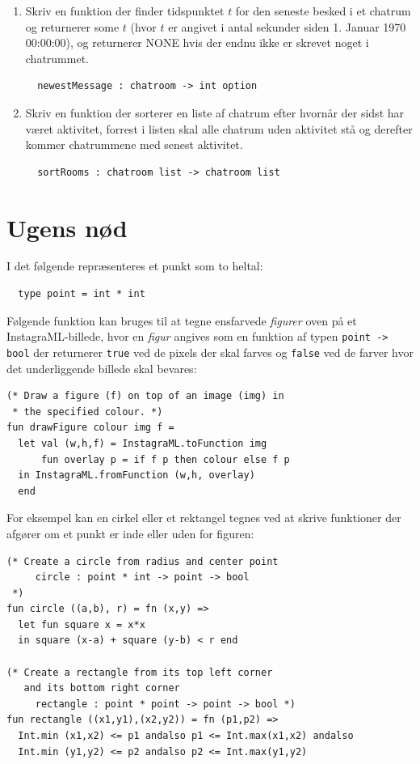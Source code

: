 \documentclass[a4paper,12pt]{article}
\begin{document}
\begin{enumerate}[{4I}1]
\item Skriv en funktion der finder tidspunktet $t$ for den seneste
  besked i et chatrum og returnerer some $t$ (hvor $t$ er angivet i
  antal sekunder siden 1. Januar 1970 00:00:00), og returnerer NONE
  hvis der endnu ikke er skrevet noget i chatrummet.
\begin{lstlisting}
  newestMessage : chatroom -> int option
\end{lstlisting}

\item Skriv en funktion der sorterer en liste af chatrum efter hvornår
  der sidst har været aktivitet, forrest i listen skal alle chatrum
  uden aktivitet stå og derefter kommer chatrummene med senest
  aktivitet.
\begin{lstlisting}
  sortRooms : chatroom list -> chatroom list
\end{lstlisting}
\end{enumerate}


\section{Ugens nød}
\label{sec:ugens-nod}
I det følgende repræsenteres et punkt som to heltal:
\begin{lstlisting}
  type point = int * int
\end{lstlisting}

Følgende funktion kan bruges til at tegne ensfarvede \textit{figurer}
oven på et InstagraML-billede, hvor en \textit{figur} angives som en
funktion af typen \lstinline{point -> bool} der returnerer
\lstinline{true} ved de pixels der skal farves og \lstinline{false}
ved de farver hvor det underliggende billede skal bevares:
\begin{lstlisting}
(* Draw a figure (f) on top of an image (img) in
 * the specified colour. *)
fun drawFigure colour img f = 
  let val (w,h,f) = InstagraML.toFunction img
      fun overlay p = if f p then colour else f p
  in InstagraML.fromFunction (w,h, overlay)
  end
\end{lstlisting}

For eksempel kan en cirkel eller et rektangel tegnes ved at skrive
funktioner der afgører om et punkt er inde eller uden for figuren:
\begin{lstlisting}
(* Create a circle from radius and center point
     circle : point * int -> point -> bool
 *)
fun circle ((a,b), r) = fn (x,y) =>
  let fun square x = x*x
  in square (x-a) + square (y-b) < r end

(* Create a rectangle from its top left corner
   and its bottom right corner
     rectangle : point * point -> point -> bool *) 
fun rectangle ((x1,y1),(x2,y2)) = fn (p1,p2) => 
  Int.min (x1,x2) <= p1 andalso p1 <= Int.max(x1,x2) andalso
  Int.min (y1,y2) <= p2 andalso p2 <= Int.max(y1,y2)
\end{lstlisting}
\end{document}

